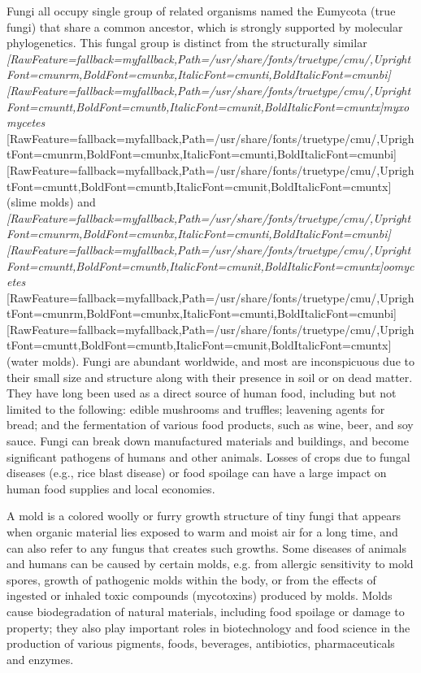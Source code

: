 Fungi all occupy single group of related organisms named the Eumycota (true fungi) that share a common ancestor, which is strongly supported by molecular phylogenetics. This fungal group is distinct from the structurally similar {\itshape \allowbreak{}\setmainfont{cmunti.ttf}[RawFeature={fallback=myfallback},Path=/usr/share/fonts/truetype/cmu/,UprightFont=cmunrm,BoldFont=cmunbx,ItalicFont=cmunti,BoldItalicFont=cmunbi]\setmonofont{cmunti.ttf}[RawFeature={fallback=myfallback},Path=/usr/share/fonts/truetype/cmu/,UprightFont=cmuntt,BoldFont=cmuntb,ItalicFont=cmunit,BoldItalicFont=cmuntx]\itshape myxomycetes}{$\text{ }$}\allowbreak{}\setmainfont{cmunrm.ttf}[RawFeature={fallback=myfallback},Path=/usr/share/fonts/truetype/cmu/,UprightFont=cmunrm,BoldFont=cmunbx,ItalicFont=cmunti,BoldItalicFont=cmunbi]\setmonofont{cmunrm.ttf}[RawFeature={fallback=myfallback},Path=/usr/share/fonts/truetype/cmu/,UprightFont=cmuntt,BoldFont=cmuntb,ItalicFont=cmunit,BoldItalicFont=cmuntx] (slime molds) and {\itshape \allowbreak{}\setmainfont{cmunti.ttf}[RawFeature={fallback=myfallback},Path=/usr/share/fonts/truetype/cmu/,UprightFont=cmunrm,BoldFont=cmunbx,ItalicFont=cmunti,BoldItalicFont=cmunbi]\setmonofont{cmunti.ttf}[RawFeature={fallback=myfallback},Path=/usr/share/fonts/truetype/cmu/,UprightFont=cmuntt,BoldFont=cmuntb,ItalicFont=cmunit,BoldItalicFont=cmuntx]\itshape oomycetes}{$\text{ }$}\allowbreak{}\setmainfont{cmunrm.ttf}[RawFeature={fallback=myfallback},Path=/usr/share/fonts/truetype/cmu/,UprightFont=cmunrm,BoldFont=cmunbx,ItalicFont=cmunti,BoldItalicFont=cmunbi]\setmonofont{cmunrm.ttf}[RawFeature={fallback=myfallback},Path=/usr/share/fonts/truetype/cmu/,UprightFont=cmuntt,BoldFont=cmuntb,ItalicFont=cmunit,BoldItalicFont=cmuntx] (water molds). Fungi are abundant worldwide, and most are inconspicuous due to their small size and structure along with their presence in soil or on dead matter. They have long been used as a direct source of human food, including but not limited to the following: edible mushrooms and truffles; leavening agents for bread; and the fermentation of various food products, such as wine, beer, and soy sauce. Fungi can break down manufactured materials and buildings, and become significant pathogens of humans and other animals. Losses of crops due to fungal diseases (e.g., rice blast disease) or food spoilage can have a large impact on human food supplies and local economies.


A mold is a colored woolly or furry growth structure of tiny fungi that appears when organic material lies exposed to warm and moist air for a long time, and can also refer to any fungus that creates such growths. Some diseases of animals and humans can be caused by certain molds, e.g. from allergic sensitivity to mold spores, growth of pathogenic molds within the body, or from the effects of ingested or inhaled toxic compounds (mycotoxins) produced by molds. Molds cause biodegradation of natural materials, including food spoilage or damage to property; they also play important roles in biotechnology and food science in the production of various pigments, foods, beverages, antibiotics, pharmaceuticals and enzymes.




